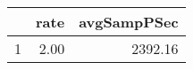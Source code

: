 \begin{table}[h]
\centering
\begingroup\tiny
\begin{tabular}{rrr}
  \hline
 & rate & avgSampPSec \\ 
  \hline
1 & 2.00 & 2392.16 \\ 
   \hline
\end{tabular}
\endgroup
\end{table}
